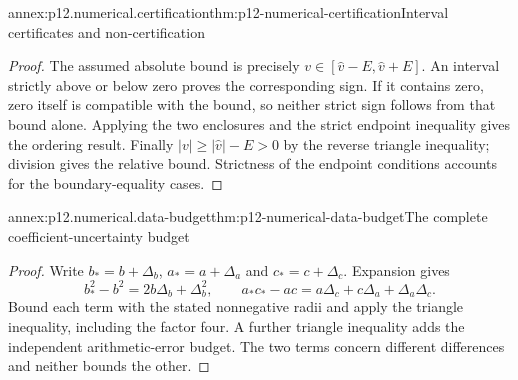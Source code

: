 \begin{annexitem}{annex:p12.numerical.certification}{thm:p12-numerical-certification}{Interval certificates and non-certification}
\begin{proof}
The assumed absolute bound is precisely
\(v\in[\widehat v-E,\widehat v+E]\). An interval strictly above
or below zero proves the corresponding sign. If it contains zero,
zero itself is compatible with the bound, so neither strict sign
follows from that bound alone. Applying the two enclosures and the
strict endpoint inequality gives the ordering result.
Finally \(|v|\geq|\widehat v|-E>0\) by the reverse triangle
inequality; division gives the relative bound. Strictness of the
endpoint conditions accounts for the boundary-equality cases.
\end{proof}
\end{annexitem}

\begin{annexitem}{annex:p12.numerical.data-budget}{thm:p12-numerical-data-budget}{The complete coefficient-uncertainty budget}
\begin{proof}
Write \(b_*=b+\Delta_b\), \(a_*=a+\Delta_a\) and
\(c_*=c+\Delta_c\). Expansion gives
\[
 b_*^2-b^2=2b\Delta_b+\Delta_b^2,\qquad
 a_*c_*-ac=a\Delta_c+c\Delta_a+\Delta_a\Delta_c.
\]
Bound each term with the stated nonnegative radii and apply the
triangle inequality, including the factor four. A further triangle
inequality adds the independent arithmetic-error budget. The two
terms concern different differences and neither bounds the other.
\end{proof}
\end{annexitem}
